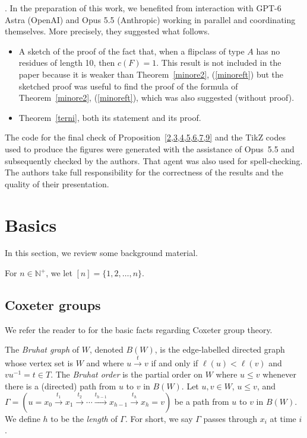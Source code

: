 \documentclass[12pt,reqno]{amsart}
\theoremstyle{plain}
\theoremstyle{definition}
\theoremstyle{remark}
\begin{document}
\bigskip
{}. 
In the preparation of this work, we benefited from interaction with GPT-6 Astra (OpenAI) and Opus 5.5 (Anthropic) working in parallel and coordinating themselves. More precisely, they suggested what follows.
\begin{itemize}
\item A sketch of the proof of the fact that, when a flipclass of  type $A$ has no residues of length 10, then $c(F)=1$. This result is not included in the paper because it is weaker than Theorem~\ref{minore2}, (\ref{minoreft}) but the sketched proof was useful to find the proof of the formula of Theorem~\ref{minore2}, (\ref{minoreft}), which was also suggested (without proof).
\item Theorem~\ref{terni}, both its statement and its proof.
\end{itemize}
The code for the final check of  Proposition~\ref{2,3,4,5,6,7,9} and the TikZ codes used to produce the figures were generated with the assistance of Opus~5.5 and subsequently checked by the authors. That agent was also used for spell-checking.
The authors take full responsibility for the correctness of the results and the quality of their presentation.

\section{Basics}


In this section, we  review some background material. 

For $n\in \mathbb N^+$, we let $[n]=\{1,2,\ldots,n\}$.

\subsection{Coxeter groups}
We refer the reader to  \cite{BB} for the basic facts regarding Coxeter group theory.

The \emph{Bruhat graph} of $W$, denoted $B(W)$, is the edge-labelled directed graph whose vertex set is $W$ and where  $u \xrightarrow{t} v$ if and only if $\ell(u)<\ell(v)$ and $vu^{-1}=t \in T$. The \emph{Bruhat order} is the partial order on $W$ where $u \leq v$ whenever there is a (directed) path from $u$ to $v$ in $B(W)$. 
 Let $u,v \in W$, $u \leq v$, and  $\Gamma= (u=x_0 \stackrel{t_1}{\longrightarrow} x_1 \stackrel{t_2}{\longrightarrow}  \cdots \stackrel{t_{h-1}}{\longrightarrow} x_{h-1}\stackrel{t_h}{\longrightarrow}  x_h=v)$ be a path from $u$ to $v$ in $B(W)$. We define
  $h$ to be the {\em length} of $\Gamma$. 
 For short, we say  $\Gamma$ passes through $x_i$ at time $i$.
\end{document}
